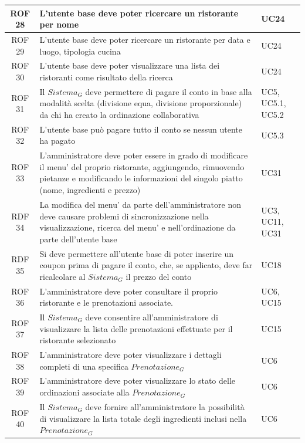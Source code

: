 \documentclass[12pt, oneside]{article}
\begin{document}
\begin{longtable}{|c|p{14cm}|p{2cm}|}
    \hline
    ROF 28 & L'utente base deve poter ricercare un ristorante per nome & UC24 \\
    \hline
    ROF 29 & L'utente base deve poter ricercare un ristorante per data e luogo, tipologia cucina & UC24 \\
    \hline
    ROF 30 & L'utente base deve poter visualizzare una lista dei ristoranti come risultato della ricerca & UC24 \\
    \hline
    ROF 31 & Il $\textit{Sistema}_G$ deve permettere di pagare il conto in base alla modalità scelta (divisione equa, divisione proporzionale) da chi ha creato la ordinazione collaborativa & UC5, UC5.1, UC5.2 \\
    \hline
    ROF 32 & L'utente base può pagare tutto il conto se nessun utente ha pagato & UC5.3 \\
    \hline
    ROF 33 & L'amministratore deve poter essere in grado di modificare il menu' del proprio ristorante, aggiungendo, rimuovendo pietanze e modificando le informazioni del singolo piatto (nome, ingredienti e prezzo) & UC31 \\
    \hline
    RDF 34 & La modifica del menu' da parte dell'amministratore non deve causare problemi di sincronizzazione nella visualizzazione, ricerca del menu' e nell'ordinazione da parte dell'utente base &  UC3, UC11, UC31 \\
    \hline
    RDF 35 & Si deve permettere all'utente base di poter inserire un coupon prima di pagare il conto, che, se applicato, deve far ricalcolare al $\textit{Sistema}_G$ il prezzo del conto & UC18 \\
    \hline
    ROF 36 & L'amministratore deve poter consultare il proprio ristorante e le prenotazioni associate. & UC6, UC15 \\
    \hline
    ROF 37 & Il $\textit{Sistema}_G$ deve consentire all'amministratore di visualizzare la lista delle prenotazioni effettuate per il ristorante selezionato & UC15 \\
    \hline
    ROF 38 & L'amministratore deve poter visualizzare i dettagli completi di una specifica $\textit{Prenotazione}_G$ & UC6 \\
    \hline
    ROF 39 & L'amministratore deve poter visualizzare lo stato delle ordinazioni associate alla $\textit{Prenotazione}_G$ & UC6 \\
    \hline
    ROF 40 & Il $\textit{Sistema}_G$ deve fornire all'amministratore la possibilità di visualizzare la lista totale degli ingredienti inclusi nella $\textit{Prenotazione}_G$ & UC6 \\

\end{longtable}
\end{document}
